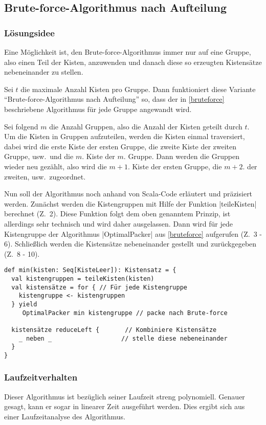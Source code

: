 \clearpage
\subsection{Brute-force-Algorithmus nach Aufteilung}
\label{auf}
\subsubsection{Lösungsidee}
 Eine Möglichkeit ist, den Brute-force-Algorithmus immer nur auf eine Gruppe,
  also einen Teil der Kisten, anzuwenden und danach diese so erzeugten Kistensätze nebeneinander zu stellen.
 
 Sei $t$ die maximale Anzahl Kisten pro Gruppe.
 Dann funktioniert diese Variante ``Brute-force-Al\-go\-rith\-mus nach Aufteilung'' so,
 dass der in \ref{bruteforce} beschriebene Algorithmus für jede Gruppe angewandt wird.

 Sei folgend $m$ die Anzahl Gruppen, also die Anzahl der Kisten geteilt durch $t$.
 Um die Kisten in Gruppen aufzuteilen, werden die Kisten einmal traversiert,
 dabei wird die erste Kiste der ersten Gruppe, die zweite Kiste der zweiten Gruppe, usw.\ und die $m.$ Kiste der $m.$ Gruppe.
 Dann werden die Gruppen wieder neu gezählt, also wird die $m+1.$ Kiste der ersten Gruppe, die $m+2.$ der zweiten, usw.\ zugeordnet.

 Nun soll der Algorithmus noch anhand von Scala-Code erläutert und präzisiert werden.
 Zunächst werden die Kistengruppen mit Hilfe der Funktion |teileKisten| berechnet (Z.\ 2).
 Diese Funktion folgt dem oben genanntem Prinzip, ist allerdings sehr technisch und wird daher ausgelassen.
 Dann wird für jede Kistengruppe der Algorithmus |OptimalPacker| aus \ref{bruteforce} aufgerufen (Z.\ 3 - 6).
 Schließlich werden die Kistensätze nebeneinander gestellt und zurückgegeben (Z.\ 8 - 10).
\begin{lstlisting}
def min(kisten: Seq[KisteLeer]): Kistensatz = {
  val kistengruppen = teileKisten(kisten)
  val kistensätze = for { // Für jede Kistengruppe
    kistengruppe <- kistengruppen
  } yield
     OptimalPacker min kistengruppe // packe nach Brute-force
  
  kistensätze reduceLeft {       // Kombiniere Kistensätze
    _ neben _                   // stelle diese nebeneinander
  }
}
\end{lstlisting}

\subsubsection{Laufzeitverhalten}
 Dieser Algorithmus ist bezüglich seiner Laufzeit streng polynomiell. Genauer gesagt, kann er sogar in linearer Zeit ausgeführt werden.
 Dies ergibt sich aus einer Laufzeitanalyse des Algorithmus.

